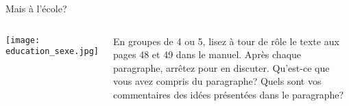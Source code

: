 \begin{frame}{Mais à l'école?}
  \begin{columns}
      \begin{center}
        \texttt{[image: education\_sexe.jpg]}
      \end{center}
      En groupes de 4 ou 5, lisez à tour de rôle le texte aux pages 48 et 49 dans le manuel.
      Après chaque paragraphe, arrêtez pour en discuter.
      Qu'est-ce que vous avez compris du paragraphe?
      Quels sont vos commentaires des idées présentées dans le paragraphe?
  \end{columns}
\end{frame}